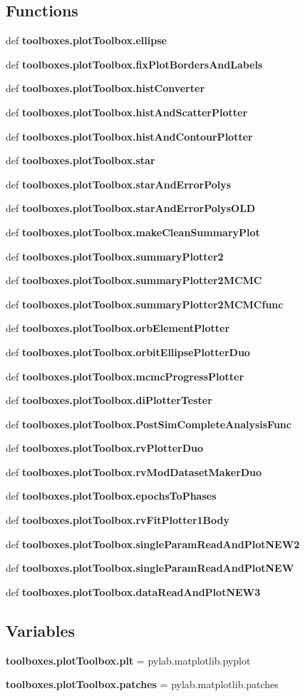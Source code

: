 \subsection*{Functions}
\begin{DoxyCompactItemize}
\item 
def {\bf toolboxes.\-plot\-Toolbox.\-ellipse}
\item 
def {\bf toolboxes.\-plot\-Toolbox.\-fix\-Plot\-Borders\-And\-Labels}
\item 
def {\bf toolboxes.\-plot\-Toolbox.\-hist\-Converter}
\item 
def {\bf toolboxes.\-plot\-Toolbox.\-hist\-And\-Scatter\-Plotter}
\item 
def {\bf toolboxes.\-plot\-Toolbox.\-hist\-And\-Contour\-Plotter}
\item 
def {\bf toolboxes.\-plot\-Toolbox.\-star}
\item 
def {\bf toolboxes.\-plot\-Toolbox.\-star\-And\-Error\-Polys}
\item 
def {\bf toolboxes.\-plot\-Toolbox.\-star\-And\-Error\-Polys\-O\-L\-D}
\item 
def {\bf toolboxes.\-plot\-Toolbox.\-make\-Clean\-Summary\-Plot}
\item 
def {\bf toolboxes.\-plot\-Toolbox.\-summary\-Plotter2}
\item 
def {\bf toolboxes.\-plot\-Toolbox.\-summary\-Plotter2\-M\-C\-M\-C}
\item 
def {\bf toolboxes.\-plot\-Toolbox.\-summary\-Plotter2\-M\-C\-M\-Cfunc}
\item 
def {\bf toolboxes.\-plot\-Toolbox.\-orb\-Element\-Plotter}
\item 
def {\bf toolboxes.\-plot\-Toolbox.\-orbit\-Ellipse\-Plotter\-Duo}
\item 
def {\bf toolboxes.\-plot\-Toolbox.\-mcmc\-Progress\-Plotter}
\item 
def {\bf toolboxes.\-plot\-Toolbox.\-di\-Plotter\-Tester}
\item 
def {\bf toolboxes.\-plot\-Toolbox.\-Post\-Sim\-Complete\-Analysis\-Func}
\item 
def {\bf toolboxes.\-plot\-Toolbox.\-rv\-Plotter\-Duo}
\item 
def {\bf toolboxes.\-plot\-Toolbox.\-rv\-Mod\-Dataset\-Maker\-Duo}
\item 
def {\bf toolboxes.\-plot\-Toolbox.\-epochs\-To\-Phases}
\item 
def {\bf toolboxes.\-plot\-Toolbox.\-rv\-Fit\-Plotter1\-Body}
\item 
def {\bf toolboxes.\-plot\-Toolbox.\-single\-Param\-Read\-And\-Plot\-N\-E\-W2}
\item 
def {\bf toolboxes.\-plot\-Toolbox.\-single\-Param\-Read\-And\-Plot\-N\-E\-W}
\item 
def {\bf toolboxes.\-plot\-Toolbox.\-data\-Read\-And\-Plot\-N\-E\-W3}
\end{DoxyCompactItemize}
\subsection*{Variables}
\begin{DoxyCompactItemize}
\item 
{\bf toolboxes.\-plot\-Toolbox.\-plt} = pylab.\-matplotlib.\-pyplot
\item 
{\bf toolboxes.\-plot\-Toolbox.\-patches} = pylab.\-matplotlib.\-patches
\end{DoxyCompactItemize}
